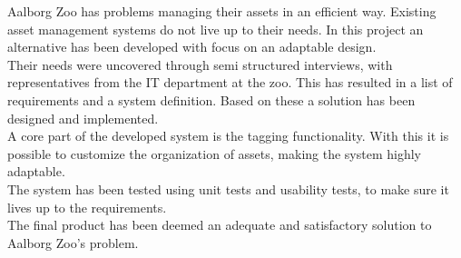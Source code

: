 Aalborg Zoo has problems managing their assets in an efficient way. Existing asset management systems do not live up to their needs. In this project an alternative has been developed with focus on an adaptable design. 
\\
Their needs were uncovered through semi structured interviews, with representatives from the IT department at the zoo. This has resulted in a list of requirements and a system definition. Based on these a solution has been designed and implemented.
\\
A core part of the developed system is the tagging functionality. With this it is possible to customize the organization of assets, making the system highly adaptable.
\\
The system has been tested using unit tests and usability tests, to make sure it lives up to the requirements.
\\
The final product has been deemed an adequate and satisfactory solution to Aalborg Zoo's problem.